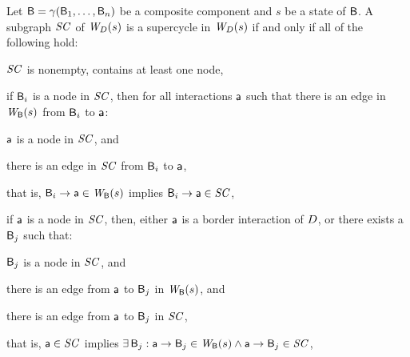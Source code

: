 \begin{definition}
\label{defn:supercycleLoc} 
Let $\B = \gamma(\B_1,\dots,\B_n)$ be a composite component and $s$ be a state of $\B$.
A subgraph $\SC$ of  $\lwfg{B}{s}{\DS}$ is a supercycle in $\lwfg{B}{s}{\DS}$ if and only if all of the following hold:
\begin{nlst1}
   \item $\SC$ is nonempty, \ie contains at least one node,

   \item if $\B_i$ is a node in $\SC$, then for all interactions $\act$ such that
there is an edge in $\wfg{\B}{s}$ from $\B_i$ to $\act$:
      \begin{nlst2}
      \item $\act$ is a node in $\SC$, and 
      \item there is an edge in $\SC$ from $\B_i$ to $\act$,
      \end{nlst2}
that is, $\B_i \ar \act \in \wfg{\B}{s}$ implies $\B_i \ar \act \in \SC$,

   \item 
if $\act$ is a node in $\SC$, then, either $\act$ is a border interaction of $\DS$, or  there exists a $\B_j$ such that:
      \begin{nlst2}
      \item $\B_j$  is a node in $\SC$, and
      \item there is an edge from $\act$ to $\B_j$ in $\wfg{\B}{s}$, and
      \item there is an edge from $\act$ to $\B_j$ in $\SC$,
      \end{nlst2}
that is, $\act \in \SC$ implies $\ex \B_j : \act \ar \B_j \in \wfg{\B}{s} \land \act \ar \B_j \in \SC$,

\end{nlst1}
\end{definition}



